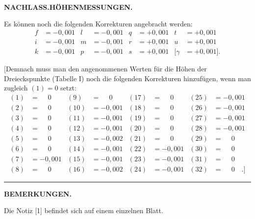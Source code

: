 \par\clearpage
\noindent{}\hfill{\small\textbf{NACHLASS.\quad HÖHENMESSUNGEN.}}\hfill\null\par\medskip
\par\noindent\hspace*{\parindent}Es können noch die folgenden Korrekturen angebracht werden:
\[
\begin{aligned}
f&=-0{,}001 & l&=-0{,}001 & q&=+0{,}001 & t&=+0{,}001\\
i&=-0{,}001 & m&=-0{,}001 & r&=+0{,}001 & u&=+0{,}001\\
k&=-0{,}001 & p&=-0{,}001 & s&=+0{,}001 & [\gamma&=+0{,}001].
\end{aligned}
\]
\par\noindent\hspace*{\parindent}[Demnach muss man den angenommenen Werten für die Höhen der
Dreieckspunkte (Tabelle I) noch die folgenden Korrekturen hinzufügen, wenn man zugleich
\((1)=0\) setzt:
\[
\begin{aligned}
(1)&=\phantom{-}0 & (9)&=\phantom{-}0 & (17)&=\phantom{-}0 & (25)&=-0{,}001\\
(2)&=\phantom{-}0 & (10)&=-0{,}001 & (18)&=\phantom{-}0 & (26)&=-0{,}001\\
(3)&=\phantom{-}0 & (11)&=-0{,}001 & (19)&=\phantom{-}0 & (27)&=-0{,}001\\
(4)&=\phantom{-}0 & (12)&=-0{,}001 & (20)&=\phantom{-}0 & (28)&=-0{,}001\\
(5)&=\phantom{-}0 & (13)&=-0{,}002 & (21)&=\phantom{-}0 & (29)&=\phantom{-}0\\
(6)&=\phantom{-}0 & (14)&=-0{,}001 & (22)&=-0{,}001 & (30)&=\phantom{-}0\\
(7)&=-0{,}001 & (15)&=-0{,}001 & (23)&=-0{,}001 & (31)&=\phantom{-}0\\
(8)&=\phantom{-}0 & (16)&=-0{,}002 & (24)&=-0{,}001 & (32)&=\phantom{-}0\quad.]
\end{aligned}
\]
\par\medskip
\begin{center}\rule{.18\linewidth}{.4pt}\end{center}
\par\bigskip
\begin{center}\small\textbf{BEMERKUNGEN.}\end{center}
\begingroup
\footnotesize
\setlength{\abovedisplayskip}{5pt}\setlength{\belowdisplayskip}{5pt}
\par\noindent\hspace*{\parindent}Die Notiz [1] befindet sich auf einem einzelnen Blatt.
